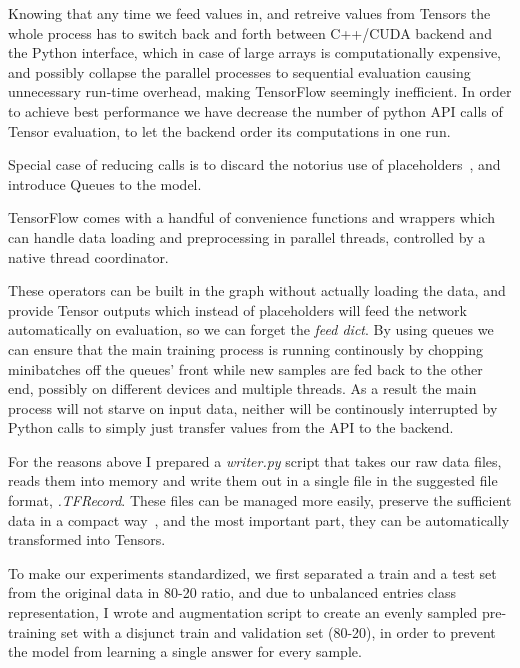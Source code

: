 Knowing that any time we feed values in, and retreive values from Tensors the whole process has to switch back and forth between C++/CUDA backend and the Python interface, which in case of large arrays is computationally expensive, and possibly collapse the parallel processes to sequential evaluation causing unnecessary run-time overhead, making TensorFlow seemingly inefficient.
In order to achieve best performance we have decrease the number of python API calls of Tensor evaluation, to let the backend order its computations in one run.

Special case of reducing calls is to discard the notorius use of placeholders~\cite{noauthor_performance_nodate, noauthor_tensorflow:_nodate}, and introduce Queues to the model.

TensorFlow comes with a handful of convenience functions and wrappers which can handle data loading and preprocessing in parallel threads, controlled by a native thread coordinator.

These operators can be built in the graph without actually loading the data, and provide Tensor outputs which instead of placeholders will feed the network automatically on evaluation, so we can forget the \textit{feed dict}.
By using queues we can ensure that the main training process is running continously by chopping minibatches off the queues' front while new samples are fed back to the other end, possibly on different devices and multiple threads.
As a result the main process will not starve on input data, neither will be continously interrupted by Python calls to simply just transfer values from the API to the backend.

For the reasons above I prepared a \textit{writer.py} script that takes our raw data files, reads them into memory and write them out in a single file in the suggested file format, \textit{.TFRecord}.
These files can be managed more easily, preserve the sufficient data in a compact way~\cite{noauthor_tfrecords_nodate}, and the most important part, they can be automatically transformed into Tensors.

To make our experiments standardized, we first separated a train and a test set from the original data in 80-20 ratio, and due to unbalanced entries class representation, I wrote and augmentation script to create an evenly sampled pre-training set with a disjunct train and validation set (80-20), in order to prevent the model from learning a single answer for every sample.

